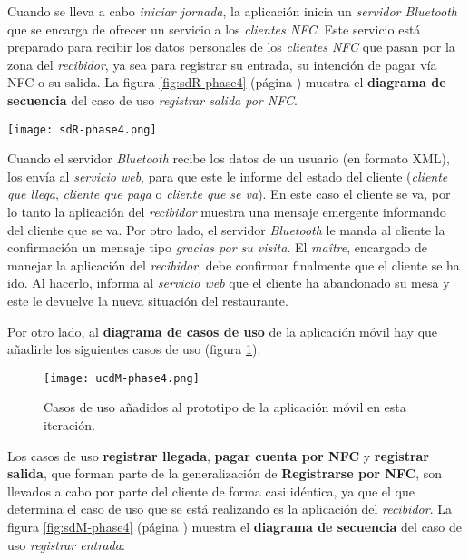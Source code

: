 Cuando se lleva a cabo \emph{iniciar jornada}, la aplicación inicia un
\emph{servidor Bluetooth} que se encarga de ofrecer un servicio a los
\emph{clientes \acs{NFC}}. Este servicio está preparado para recibir
los datos personales de los \emph{clientes \acs{NFC}} que pasan por la
zona del \emph{recibidor}, ya sea para registrar su entrada, su intención de
pagar vía \acs{NFC} o su salida. La figura \ref{fig:sdR-phase4} (página
\pageref{fig:sdR-phase4}) muestra el \textbf{diagrama de secuencia} del
caso de uso \emph{registrar salida por \acs{NFC}}.

  \begin{sidewaysfigure}[h]
    \begin{center}
      \texttt{[image: sdR-phase4.png]}
      \caption{Diagrama de secuencia del caso de uso \emph{registrar salida
      por \acs{NFC}}.}
      \label{fig:sdR-phase4}
    \end{center}
  \end{sidewaysfigure}

Cuando el servidor \emph{Bluetooth} recibe los datos de un usuario (en formato
\acs{XML}), los envía al \emph{servicio web}, para que este le informe del
estado del cliente (\emph{cliente que llega}, \emph{cliente que paga} o
\emph{cliente que se va}). En este caso el cliente se va, por lo tanto la
aplicación del \emph{recibidor} muestra una mensaje emergente informando
del cliente que se va. Por otro lado, el servidor \emph{Bluetooth} le manda
al cliente la confirmación un mensaje tipo \emph{gracias por su visita}.
El \emph{maître}, encargado de manejar la aplicación del \emph{recibidor},
debe confirmar finalmente que el cliente se ha ido. Al hacerlo, informa
al \emph{servicio web} que el cliente ha abandonado su mesa y este le
devuelve la nueva situación del restaurante.

Por otro lado, al \textbf{diagrama de casos de uso} de la aplicación móvil
hay que añadirle los siguientes casos de uso (figura \ref{fig:ucdM-phase4}):

  \begin{figure}[H]
    \begin{center}
      \texttt{[image: ucdM-phase4.png]}
      \caption{Casos de uso añadidos al prototipo de la aplicación
      móvil en esta iteración.}
      \label{fig:ucdM-phase4}
    \end{center}
  \end{figure}

Los casos de uso \textbf{registrar llegada}, \textbf{pagar cuenta por
\acs{NFC}} y \textbf{registrar salida}, que forman parte de la generalización
de \textbf{Registrarse por \acs{NFC}}, son llevados a cabo por parte del
cliente de forma casi idéntica, ya que el que determina el caso de uso que
se está realizando es la aplicación del \emph{recibidor}. La figura
\ref{fig:sdM-phase4} (página \pageref{fig:sdM-phase4}) muestra el
\textbf{diagrama de secuencia} del caso de uso \emph{registrar entrada}:

